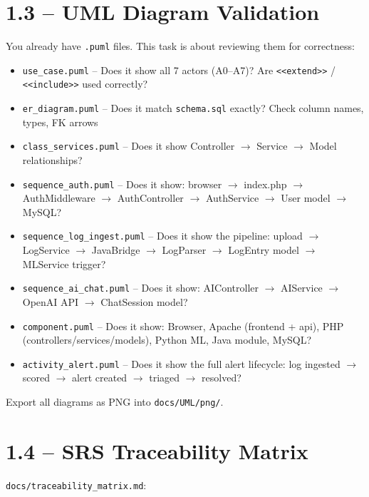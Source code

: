 \documentclass[11pt,a4paper]{report}
\newcommand{\todo}{\textcolor{helixamber}{\textbf{[ ]}}}
\newcommand{\filepath}[1]{\texttt{\small#1}}
\begin{document}
\section{1.3 -- UML Diagram Validation}

You already have \texttt{.puml} files. This task is about reviewing them for correctness:

\begin{itemize}
    \item[\todo] \filepath{use\_case.puml} -- Does it show all 7 actors (A0--A7)? Are \texttt{<<extend>>} / \texttt{<<include>>} used correctly?
    \item[\todo] \filepath{er\_diagram.puml} -- Does it match \filepath{schema.sql} exactly? Check column names, types, FK arrows
    \item[\todo] \filepath{class\_services.puml} -- Does it show Controller $\rightarrow$ Service $\rightarrow$ Model relationships?
    \item[\todo] \filepath{sequence\_auth.puml} -- Does it show: browser $\rightarrow$ index.php $\rightarrow$ AuthMiddleware $\rightarrow$ AuthController $\rightarrow$ AuthService $\rightarrow$ User model $\rightarrow$ MySQL?
    \item[\todo] \filepath{sequence\_log\_ingest.puml} -- Does it show the pipeline: upload $\rightarrow$ LogService $\rightarrow$ JavaBridge $\rightarrow$ LogParser $\rightarrow$ LogEntry model $\rightarrow$ MLService trigger?
    \item[\todo] \filepath{sequence\_ai\_chat.puml} -- Does it show: AIController $\rightarrow$ AIService $\rightarrow$ OpenAI API $\rightarrow$ ChatSession model?
    \item[\todo] \filepath{component.puml} -- Does it show: Browser, Apache (frontend + api), PHP (controllers/services/models), Python ML, Java module, MySQL?
    \item[\todo] \filepath{activity\_alert.puml} -- Does it show the full alert lifecycle: log ingested $\rightarrow$ scored $\rightarrow$ alert created $\rightarrow$ triaged $\rightarrow$ resolved?
\end{itemize}

Export all diagrams as PNG into \filepath{docs/UML/png/}.

\section{1.4 -- SRS Traceability Matrix}

\filepath{docs/traceability\_matrix.md}:
\end{document}
